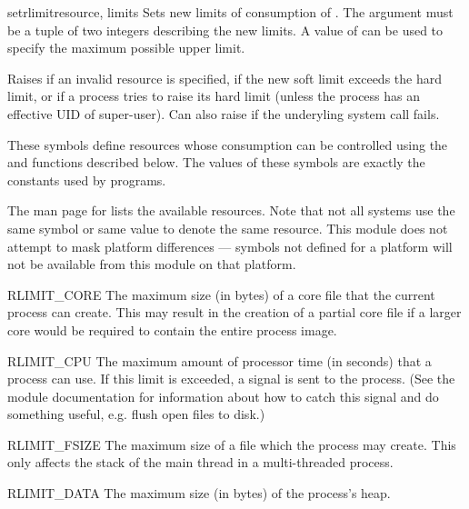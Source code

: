 \begin{funcdesc}{setrlimit}{resource, limits}
  Sets new limits of consumption of . The 
  argument must be a tuple  of two
  integers describing the new limits. A value of  can be used to
  specify the maximum possible upper limit.

  Raises  if an invalid resource is specified,
  if the new soft limit exceeds the hard limit, or if a process tries
  to raise its hard limit (unless the process has an effective UID of
  super-user).  Can also raise  if the underyling
  system call fails.
\end{funcdesc}

These symbols define resources whose consumption can be controlled
using the  and  functions
described below. The values of these symbols are exactly the constants
used by \C{} programs.

The \UNIX{} man page for  lists the available
resources.  Note that not all systems use the same symbol or same
value to denote the same resource.  This module does not attempt to
mask platform differences --- symbols not defined for a platform will
not be available from this module on that platform.

\begin{datadesc}{RLIMIT_CORE}
  The maximum size (in bytes) of a core file that the current process
  can create.  This may result in the creation of a partial core file
  if a larger core would be required to contain the entire process
  image.
\end{datadesc}

\begin{datadesc}{RLIMIT_CPU}
  The maximum amount of processor time (in seconds) that a process can
  use. If this limit is exceeded, a  signal is sent to
  the process. (See the  module documentation for
  information about how to catch this signal and do something useful,
  e.g. flush open files to disk.)
\end{datadesc}

\begin{datadesc}{RLIMIT_FSIZE}
  The maximum size of a file which the process may create.  This only
  affects the stack of the main thread in a multi-threaded process.
\end{datadesc}

\begin{datadesc}{RLIMIT_DATA}
  The maximum size (in bytes) of the process's heap.
\end{datadesc}

